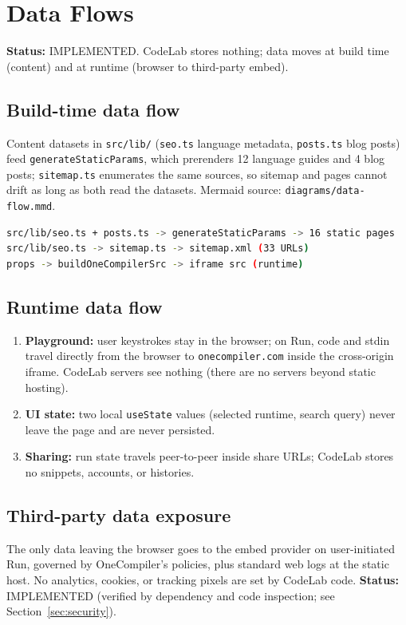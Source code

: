 \section{Data Flows}
\label{sec:data-flows}

\textbf{Status:} IMPLEMENTED. CodeLab stores nothing; data moves at build time (content) and at runtime (browser to third-party embed).

\subsection{Build-time data flow}
Content datasets in \texttt{src/lib/} (\texttt{seo.ts} language metadata, \texttt{posts.ts} blog posts) feed \texttt{generateStaticParams}, which prerenders 12 language guides and 4 blog posts; \texttt{sitemap.ts} enumerates the same sources, so sitemap and pages cannot drift as long as both read the datasets. Mermaid source: \texttt{diagrams/data-flow.mmd}.

\begin{lstlisting}[language=bash,caption={Build-time data flow (text diagram; Mermaid source in diagrams/data-flow.mmd)}]
src/lib/seo.ts + posts.ts -> generateStaticParams -> 16 static pages
src/lib/seo.ts -> sitemap.ts -> sitemap.xml (33 URLs)
props -> buildOneCompilerSrc -> iframe src (runtime)
\end{lstlisting}

\subsection{Runtime data flow}
\begin{enumerate}
\item \textbf{Playground:} user keystrokes stay in the browser; on Run, code and stdin travel directly from the browser to \texttt{onecompiler.com} inside the cross-origin iframe. CodeLab servers see nothing (there are no servers beyond static hosting).
\item \textbf{UI state:} two local \texttt{useState} values (selected runtime, search query) never leave the page and are never persisted.
\item \textbf{Sharing:} run state travels peer-to-peer inside share URLs; CodeLab stores no snippets, accounts, or histories.
\end{enumerate}

\subsection{Third-party data exposure}
The only data leaving the browser goes to the embed provider on user-initiated Run, governed by OneCompiler's policies, plus standard web logs at the static host. No analytics, cookies, or tracking pixels are set by CodeLab code. \textbf{Status:} IMPLEMENTED (verified by dependency and code inspection; see Section~\ref{sec:security}).
